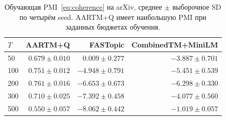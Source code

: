 \begin{table}[H]
\centering
\small
\caption{Обучающая PMI~\eqref{eq:coherence} на arXiv, среднее $\pm$ выборочное SD по четырём seed. AARTM+Q имеет наибольшую PMI при заданных бюджетах обучения.}
\label{tab:baselines}
\begin{tabular}{lrrr}
\toprule
$T$ & AARTM+Q & FASTopic & CombinedTM+MiniLM \\
\midrule
50 & $0.679\pm0.010$ & $0.009\pm0.277$ & $-3.887\pm0.701$ \\
100 & $0.751\pm0.012$ & $-4.948\pm0.791$ & $-5.451\pm0.539$ \\
200 & $0.761\pm0.016$ & $-6.653\pm0.673$ & $-6.298\pm0.330$ \\
300 & $0.710\pm0.025$ & $-7.392\pm0.458$ & $-4.077\pm0.560$ \\
500 & $0.550\pm0.057$ & $-8.062\pm0.442$ & $-1.019\pm0.057$ \\
\bottomrule
\end{tabular}
\end{table}
